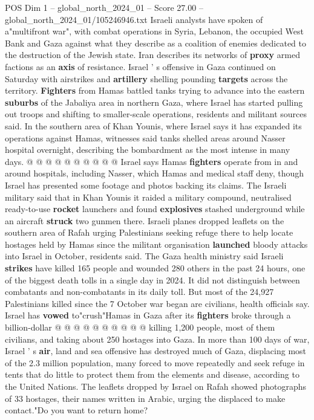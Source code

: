 \begin{textsample}{POS Dim 1 – global\_north\_2024\_01 – Score 27.00 – global\_north\_2024\_01/105246946.txt}
Israeli analysts have spoken of a"multifront war", with combat operations in Syria, Lebanon, the occupied West Bank and Gaza against what they describe as a coalition of enemies dedicated to the destruction of the Jewish state.
Iran describes its networks of \textbf{proxy} armed factions as an \textbf{axis} of resistance.
Israel ' s offensive in Gaza continued on Saturday with airstrikes and \textbf{artillery} shelling pounding \textbf{targets} across the territory. \textbf{Fighters} from Hamas battled tanks trying to advance into the eastern \textbf{suburbs} of the Jabaliya area in northern Gaza, where Israel has started pulling out troops and shifting to smaller-scale operations, residents and militant sources said.
In the southern area of Khan Younis, where Israel says it has expanded its operations against Hamas, witnesses said tanks shelled areas around Nasser hospital overnight, describing the bombardment as the most intense in many days. @ @ @ @ @ @ @ @ @ @ Israel says Hamas \textbf{fighters} operate from in and around hospitals, including Nasser, which Hamas and medical staff deny, though Israel has presented some footage and photos backing its claims.
The Israeli military said that in Khan Younis it raided a military compound, neutralised ready-to-use \textbf{rocket} launchers and found \textbf{explosives} stashed underground while an aircraft \textbf{struck} two gunmen there.
Israeli planes dropped leaflets on the southern area of Rafah urging Palestinians seeking refuge there to help locate hostages held by Hamas since the militant organisation \textbf{launched} bloody attacks into Israel in October, residents said.
The Gaza health ministry said Israeli \textbf{strikes} have killed 165 people and wounded 280 others in the past 24 hours, one of the biggest death tolls in a single day in 2024.
It did not distinguish between combatants and non-combatants in its daily toll.
But most of the 24,927 Palestinians killed since the 7 October war began are civilians, health officials say.
Israel has \textbf{vowed} to"crush"Hamas in Gaza after its \textbf{fighters} broke through a billion-dollar @ @ @ @ @ @ @ @ @ @ killing 1,200 people, most of them civilians, and taking about 250 hostages into Gaza.
In more than 100 days of war, Israel ' s \textbf{air}, land and sea offensive has destroyed much of Gaza, displacing most of the 2.3 million population, many forced to move repeatedly and seek refuge in tents that do little to protect them from the elements and disease, according to the United Nations.
The leaflets dropped by Israel on Rafah showed photographs of 33 hostages, their names written in Arabic, urging the displaced to make contact."Do you want to return home?

\end{textsample}
